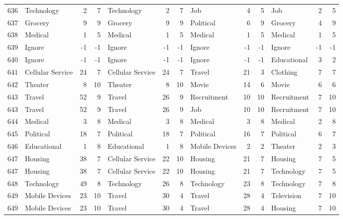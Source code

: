 \begin{figure}[htbp]
\begin{tabular}{rlrrlrrlrrlrr}
    636   & Technology & 2     & 7     & Technology & 2     & 7     & Job   & 4     & 5     & Job   & 2     & 5 \\
    637   & Grocery & 9     & 9     & Grocery & 9     & 9     & Political & 6     & 9     & Grocery & 4     & 9 \\
    638   & Medical & 1     & 5     & Medical & 1     & 5     & Medical & 1     & 5     & Medical & 1     & 5 \\
    639   & Ignore & -1    & -1    & Ignore & -1    & -1    & Ignore & -1    & -1    & Ignore & -1    & -1 \\
    640   & Ignore & -1    & -1    & Ignore & -1    & -1    & Ignore & -1    & -1    & Educational & 3     & 2 \\
    641   & Cellular Service & 24    & 7     & Cellular Service & 24    & 7     & Travel & 21    & 3     & Clothing & 7     & 7 \\
    642   & Theater & 8     & 10    & Theater & 8     & 10    & Movie & 14    & 6     & Movie & 6     & 6 \\
    643   & Travel & 52    & 9     & Travel & 26    & 9     & Recruitment & 10    & 10    & Recruitment & 7     & 10 \\
    643   & Travel & 52    & 9     & Travel & 26    & 9     & Job   & 10    & 10    & Recruitment & 7     & 10 \\
    644   & Medical & 3     & 8     & Medical & 3     & 8     & Medical & 3     & 8     & Medical & 2     & 8 \\
    645   & Political & 18    & 7     & Political & 18    & 7     & Political & 16    & 7     & Political & 6     & 7 \\
    646   & Educational & 1     & 8     & Educational & 1     & 8     & Mobile Devices & 2     & 2     & Theater & 2     & 3 \\
    647   & Housing & 38    & 7     & Cellular Service & 22    & 10    & Housing & 21    & 7     & Housing & 7     & 5 \\
    647   & Housing & 38    & 7     & Cellular Service & 22    & 10    & Housing & 21    & 7     & Technology & 7     & 5 \\
    648   & Technology & 49    & 8     & Technology & 26    & 8     & Technology & 23    & 8     & Technology & 7     & 8 \\
    649   & Mobile Devices & 23    & 10    & Travel & 30    & 4     & Travel & 28    & 4     & Television & 7     & 10 \\
    649   & Mobile Devices & 23    & 10    & Travel & 30    & 4     & Travel & 28    & 4     & Housing & 7     & 10 \\

\end{tabular}
\end{figure}
